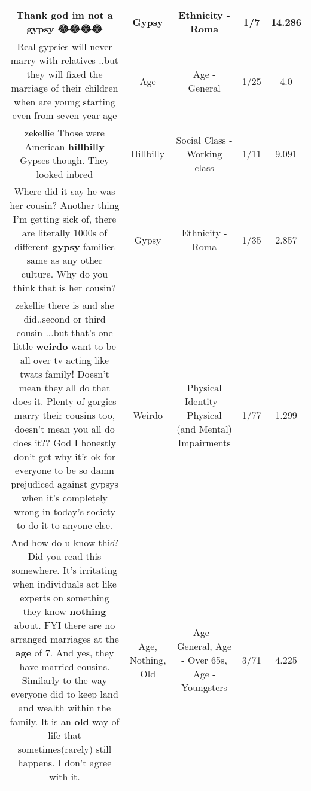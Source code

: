 \documentclass[11pt]{article}
\newlength\mylength
\begin{document}
\begin{center}
\begin{longtable}{|C{.65\mylength}|C{.30\mylength}|C{.12\mylength}|C{.12\mylength}|C{.12\mylength}|}
  \small Thank god im not a \textbf{gypsy} 😂😂😂😂\normalsize   & Gypsy & Ethnicity - Roma & 1/7 & 14.286 \\  \hline
  \small Real gypsies will never marry with relatives ..but they will fixed the marriage of their children when are young starting even from seven year age\normalsize   & Age & Age - General & 1/25 & 4.0 \\  \hline
  \small zekellie    Those were American \textbf{hillbilly} Gypses though. They looked inbred\normalsize   & Hillbilly & Social Class - Working class & 1/11 & 9.091 \\  \hline
  \small Where did it say he was her cousin? Another thing I'm getting sick of, there are literally 1000s of different \textbf{gypsy} families same as any other culture. Why do you think that is her cousin?\normalsize   & Gypsy & Ethnicity - Roma & 1/35 & 2.857 \\  \hline
  \small zekellie    there is and she did..second or third cousin ...but that's one little \textbf{weirdo} want to be all over tv acting like twats family! Doesn't mean they all do that does it. Plenty of gorgies marry their cousins too, doesn't mean you all do does it?? God I honestly don't get why it's ok for everyone to be so damn prejudiced against gypsys when it's completely wrong in today's society to do it to anyone else.\normalsize   & Weirdo & Physical Identity - Physical (and Mental) Impairments & 1/77 & 1.299 \\  \hline
  \small And how do u know this? Did you read this somewhere. It's irritating when individuals act like experts on something they know \textbf{nothing} about. FYI there are no arranged marriages at the \textbf{age} of 7. And yes, they have married cousins. Similarly to the way everyone did to keep land and wealth within the family. It is an \textbf{old} way of life that sometimes(rarely) still happens. I don't agree with it.\normalsize   & Age, Nothing, Old & Age - General, Age - Over 65s, Age - Youngsters & 3/71 & 4.225 \\  \hline

\end{longtable}
\end{center}
\end{document}
